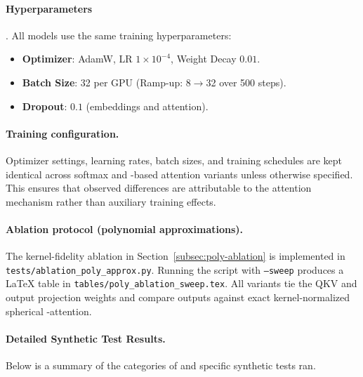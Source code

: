 \documentclass{article}
\DeclareRobustCommand{\E}{\text{\normalfont\tifinaghfont ⵟ}}
\begin{document}
\paragraph{Hyperparameters}. All models use the same training hyperparameters:
\begin{itemize}[leftmargin=*]
    \setlength\itemsep{0em}
    \item \textbf{Optimizer}: AdamW, LR $1 \times 10^{-4}$, Weight Decay $0.01$.
    \item \textbf{Batch Size}: 32 per GPU (Ramp-up: 8$\to$32 over 500 steps).
    \item \textbf{Dropout}: $0.1$ (embeddings and attention).
\end{itemize}

\paragraph{Training configuration.}
Optimizer settings, learning rates, batch sizes, and training schedules are kept identical across softmax and \E-based attention variants unless otherwise specified. This ensures that observed differences are attributable to the attention mechanism rather than auxiliary training effects.

\paragraph{Ablation protocol (polynomial approximations).}
The kernel-fidelity ablation in Section~\ref{subsec:poly-ablation} is implemented in \texttt{tests/ablation\_poly\_approx.py}. Running the script with \texttt{--sweep} produces a LaTeX table in \texttt{tables/poly\_ablation\_sweep.tex}. All variants tie the $\mathrm{QKV}$ and output projection weights and compare outputs against exact kernel-normalized spherical \E-attention.

\paragraph{Detailed Synthetic Test Results.}

Below is a summary of the categories of and specific synthetic tests ran. 
\end{document}
